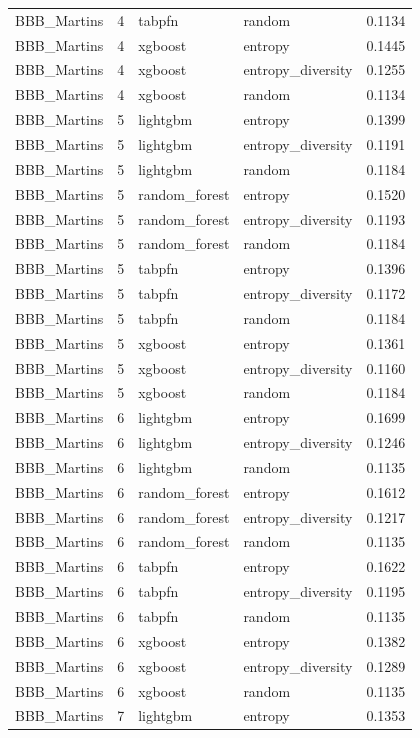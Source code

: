 \begin{tabular}{lrllr}
BBB_Martins & 4 & tabpfn & random & 0.1134 \\
BBB_Martins & 4 & xgboost & entropy & 0.1445 \\
BBB_Martins & 4 & xgboost & entropy_diversity & 0.1255 \\
BBB_Martins & 4 & xgboost & random & 0.1134 \\
BBB_Martins & 5 & lightgbm & entropy & 0.1399 \\
BBB_Martins & 5 & lightgbm & entropy_diversity & 0.1191 \\
BBB_Martins & 5 & lightgbm & random & 0.1184 \\
BBB_Martins & 5 & random_forest & entropy & 0.1520 \\
BBB_Martins & 5 & random_forest & entropy_diversity & 0.1193 \\
BBB_Martins & 5 & random_forest & random & 0.1184 \\
BBB_Martins & 5 & tabpfn & entropy & 0.1396 \\
BBB_Martins & 5 & tabpfn & entropy_diversity & 0.1172 \\
BBB_Martins & 5 & tabpfn & random & 0.1184 \\
BBB_Martins & 5 & xgboost & entropy & 0.1361 \\
BBB_Martins & 5 & xgboost & entropy_diversity & 0.1160 \\
BBB_Martins & 5 & xgboost & random & 0.1184 \\
BBB_Martins & 6 & lightgbm & entropy & 0.1699 \\
BBB_Martins & 6 & lightgbm & entropy_diversity & 0.1246 \\
BBB_Martins & 6 & lightgbm & random & 0.1135 \\
BBB_Martins & 6 & random_forest & entropy & 0.1612 \\
BBB_Martins & 6 & random_forest & entropy_diversity & 0.1217 \\
BBB_Martins & 6 & random_forest & random & 0.1135 \\
BBB_Martins & 6 & tabpfn & entropy & 0.1622 \\
BBB_Martins & 6 & tabpfn & entropy_diversity & 0.1195 \\
BBB_Martins & 6 & tabpfn & random & 0.1135 \\
BBB_Martins & 6 & xgboost & entropy & 0.1382 \\
BBB_Martins & 6 & xgboost & entropy_diversity & 0.1289 \\
BBB_Martins & 6 & xgboost & random & 0.1135 \\
BBB_Martins & 7 & lightgbm & entropy & 0.1353 \\

\end{tabular}
